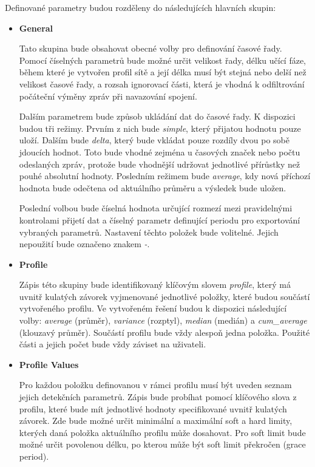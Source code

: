  
 Definované parametry budou rozděleny do následujících hlavních skupin:
 \begin{itemize}
  \item \textbf{General} 
  
  Tato skupina bude obsahovat obecné volby pro definování časové řady. Pomocí číselných parametrů 
  bude možné určit velikost řady, délku učící fáze, během které je vytvořen profil sítě a její délka
  musí být stejná nebo delší než velikost časové řady, a rozsah ignorovací části, která je vhodná
  k odfiltrování počáteční výměny zpráv při navazování spojení. 
  
  Dalším parametrem bude způsob 
  ukládání dat do časové řady. K dispozici budou tři režimy. Prvním z nich bude \textit{simple},
  který přijatou
  hodnotu pouze uloží. Dalším bude \textit{delta}, který bude vkládat pouze rozdíly dvou po
  sobě jdoucích hodnot. 
  Toto bude vhodné zejména u časových značek nebo počtu odeslaných zpráv, protože bude vhodnější 
  udržovat jednotlivé přírůstky než pouhé absolutní hodnoty. Posledním režimem bude
  \textit{average}, kdy 
  nová příchozí hodnota bude odečtena od aktuálního průměru a výsledek bude uložen.
  
  Poslední volbou bude číselná hodnota určující rozmezí mezi pravidelnými kontrolami
  přijetí dat a 
  číselný parametr definující periodu pro exportování vybraných parametrů. Nastavení těchto položek
  bude volitelné. Jejich nepoužití bude označeno znakem \textit{-}.
  
  \item \textbf{Profile}
  
  Zápis této skupiny bude identifikovaný klíčovým slovem \textit{profile}, který má uvnitř kulatých závorek 
  vyjmenované jednotlivé položky, které budou součástí vytvořeného profilu. Ve vytvořeném řešení 
  budou k dispozici následující volby: \textit{average} (průměr), \textit{variance} (rozptyl), 
  \textit{median} (medián) a \textit{cum\_average} (klouzavý průměr). Součástí profilu bude vždy alespoň
  jedna položka. Použité části a jejich počet bude vždy záviset na uživateli.
  
  \item \textbf{Profile Values}
  
  Pro každou položku definovanou v rámci profilu musí být uveden seznam jejich detekčních parametrů.
  Zápis bude probíhat pomocí klíčového slova z profilu, které bude mít jednotlivé hodnoty 
  specifikované uvnitř kulatých závorek. Zde bude možné určit minimální a maximální soft a hard
  limity, kterých daná položka aktuálního profilu může dosahovat. Pro soft limit bude možné 
  určit povolenou délku, po kterou může být soft limit překročen (grace period). 
  

\end{itemize}
